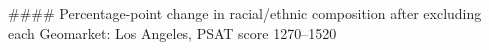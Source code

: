 #### Percentage-point change in racial/ethnic composition after excluding each Geomarket: Los Angeles, PSAT score 1270–1520
